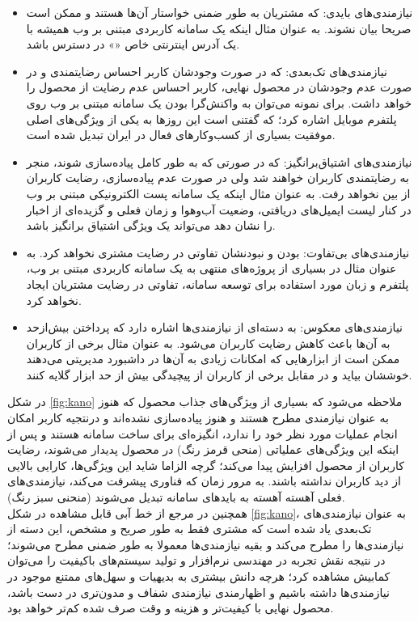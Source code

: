 \begin{itemize}
	\item 
	نیازمندی‌های بایدی: که مشتریان به طور ضمنی خواستار آن‌ها هستند و ممکن است صریحا بیان نشوند. به عنوان مثال اینکه یک سامانه کاربردی مبتنی بر وب همیشه با یک آدرس اینترنتی خاص
«»
	در دسترس باشد.
	\item
	نیازمندی‌های تک‌بعدی: که در صورت وجودشان کاربر احساس رضایتمندی و در صورت عدم وجودشان در محصول نهایی، کاربر احساس عدم رضایت از محصول را خواهد داشت. برای نمونه می‌توان به واکنش‌گرا بودن یک سامانه مبتنی بر وب روی پلتفرم موبایل اشاره کرد؛ که گفتنی است این روزها به یکی از ویژگی‌های اصلی موفقیت بسیاری از کسب‌وکارهای فعال در ایران تبدیل شده است.
	\item 
	نیازمندی‌های اشتیاق‌برانگیز: که در صورتی که به طور کامل پیاده‌سازی شوند، منجر به رضایتمندی کاربران خواهند شد ولی در صورت عدم پیاده‌سازی، رضایت کاربران از بین نخواهد رفت. به عنوان مثال اینکه یک سامانه پست الکترونیکی مبتنی بر وب در کنار لیست ایمیل‌های دریافتی، وضعیت آب‌وهوا و زمان فعلی و گزیده‌ای از اخبار را نشان دهد می‌تواند یک ویژگی اشتیاق برانگیز باشد.
	\item 
	نیازمندی‌های بی‌تفاوت: بودن و نبودنشان تفاوتی در رضایت مشتری نخواهد کرد. به عنوان مثال در بسیاری از پروژه‌های منتهی به یک سامانه کاربردی مبتنی بر وب، پلتفرم و زبان مورد استفاده برای توسعه سامانه، تفاوتی در رضایت مشتریان ایجاد نخواهد کرد.
	\item 
	نیازمندی‌های معکوس: به دسته‌ای از نیازمندی‌ها اشاره دارد که پرداختن بیش‌ازحد به آن‌ها باعث کاهش رضایت کاربران می‌شود. به عنوان مثال برخی از کاربران ممکن است از ابزارهایی که امکانات زیادی به آن‌ها در داشبورد مدیریتی می‌دهند خوششان بیاید و در مقابل برخی از کاربران از پیچیدگی بیش از حد ابزار گلایه کنند.
\end{itemize}
در شکل
\ref{fig:kano}
ملاحظه می‌شود که بسیاری از ویژگی‌های جذاب محصول که هنوز به عنوان نیازمندی مطرح هستند و هنوز پیاده‌سازی نشده‌اند و درنتجیه کاربر امکان انجام عملیات مورد نظر خود را ندارد، انگیزه‌ای برای ساخت سامانه هستند و پس از اینکه این ویژگی‌های عملیاتی (منحی قرمز رنگ) در محصول پدیدار می‌شوند، رضایت کاربران از محصول افزایش پیدا می‌کند؛ گرچه الزاما شاید این ویژگی‌ها، کارایی بالایی از دید کاربران نداشته باشند. به مرور زمان که فناوری پیشرفت می‌کند، نیازمندی‌های فعلی آهسته آهسته به باید‌های سامانه تبدیل می‌شوند (منحنی سبز رنگ).\\
همچنین در مرجع
\cite{sauerwein_kano_1996}
از خط آبی قابل مشاهده در شکل
\ref{fig:kano}،
به عنوان نیازمندی‌های تک‌بعدی یاد شده است که مشتری فقط به طور صریح و مشخص، این دسته از نیازمندی‌ها را مطرح می‌کند و بقیه نیازمندی‌ها معمولا به طور ضمنی مطرح می‌شوند؛ در نتیجه نقش تجربه در مهندسی نرم‌افزار و تولید سیستم‌های باکیفیت را می‌توان کمابیش مشاهده کرد؛ هرچه دانش بیشتری به بدیهیات و سهل‌های ممتنع موجود در نیازمندی‌ها داشته باشیم و اظهارمندی نیازمندی شفاف و مدون‌تری در دست باشد، محصول نهایی با کیفیت‌تر و هزینه و وقت صرف شده کم‌تر خواهد بود.\\
